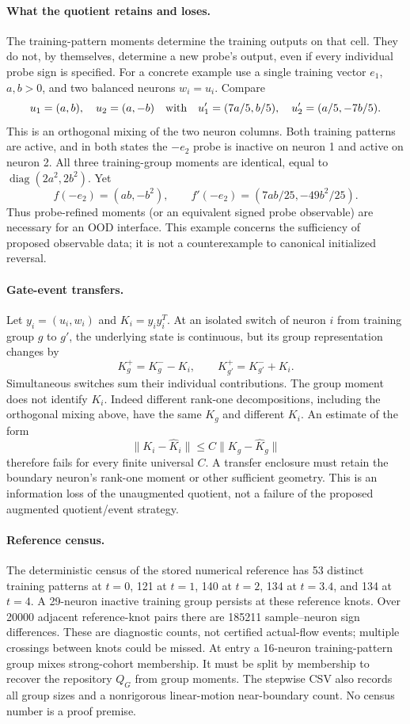 \documentclass[10pt]{article}
\begin{document}
\paragraph{What the quotient retains and loses.}
The training-pattern moments determine the training outputs on that cell.
They do not, by themselves, determine a new probe's output, even if every
individual probe sign is specified. For a concrete example use a single
training vector $e_1$, $a,b>0$, and two balanced neurons $w_i=u_i$.
Compare
\[
 u_1=(a,b),\quad u_2=(a,-b)
 \quad\hbox{with}\quad
 u'_1=(7a/5,b/5),\quad u'_2=(a/5,-7b/5).
\]
This is an orthogonal mixing of the two neuron columns. Both training
patterns are active, and in both states the $-e_2$ probe is inactive on
neuron 1 and active on neuron 2. All three training-group moments are
identical, equal to $\operatorname{diag}(2a^2,2b^2)$. Yet
\[
 f(-e_2)=(ab,-b^2),\qquad
 f'(-e_2)=(7ab/25,-49b^2/25).
\]
Thus probe-refined moments (or an equivalent signed probe observable)
are necessary for an OOD interface. This example concerns the sufficiency
of proposed observable data; it is not a counterexample to canonical
initialized reversal.

\paragraph{Gate-event transfers.}
Let $y_i=(u_i,w_i)$ and $K_i=y_iy_i^T$. At an isolated switch of neuron $i$
from training group $g$ to $g'$, the underlying state is continuous, but
its group representation changes by
\[
 K_g^+=K_g^- -K_i,\qquad K_{g'}^+=K_{g'}^-+K_i.
\]
Simultaneous switches sum their individual contributions. The group moment
does not identify $K_i$. Indeed different rank-one decompositions, including
the orthogonal mixing above, have the same $K_g$ and different $K_i$.
An estimate of the form
\begin{equation}\label{eq:invalid-transfer-bound}
 \|K_i-\widehat K_i\|\le C\|K_g-\widehat K_g\|
\end{equation}
therefore fails for every finite universal $C$. A transfer enclosure must
retain the boundary neuron's rank-one moment or other sufficient geometry.
This is an information loss of the unaugmented quotient, not a failure of
the proposed augmented quotient/event strategy.

\paragraph{Reference census.}
The deterministic census of the stored numerical reference has 53 distinct
training patterns at $t=0$, 121 at $t=1$, 140 at $t=2$, 134 at $t=3.4$,
and 134 at $t=4$. A 29-neuron inactive training group persists at these
reference knots. Over 20000 adjacent reference-knot pairs there are 185211
sample--neuron sign differences. These are diagnostic counts, not certified
actual-flow events; multiple crossings between knots could be missed.
At entry a 16-neuron training-pattern group mixes strong-cohort membership.
It must be split by membership to recover the repository $Q_G$ from group
moments. The stepwise CSV also records all group sizes and a nonrigorous
linear-motion near-boundary count. No census number is a proof premise.
\end{document}
